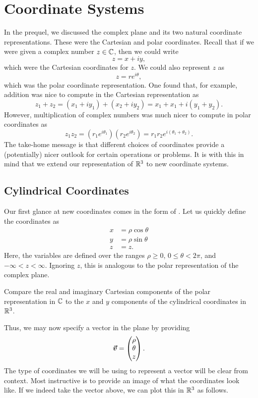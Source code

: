 \chapter{Coordinate Systems}
In the prequel, we discussed the complex plane and its two natural coordinate representations.  These were the Cartesian and polar coordinates.  Recall that if we were given a complex number $z\in \mathbb{C}$, then we could write
\[
z=x+iy,
\]
which were the Cartesian coordinates for $z$. We could also represent $z$ as
\[
z=re^{i\theta},
\]
which was the polar coordinate representation.  One found that, for example, addition was nice to compute in the Cartesian representation as
\[
z_1+z_2 = (x_1+iy_1)+(x_2+iy_2) = x_1+x_1 + i (y_1+y_2).
\]
However, multiplication of complex numbers was much nicer to compute in polar coordinates as
\[
z_1z_2 = \left(r_1 e^{i\theta_1}\right)\left(r_2 e^{i\theta_2}\right) = r_1r_2 e^{i(\theta_1+\theta_2)}.
\]
The take-home message is that different choices of coordinates provide a (potentially) nicer outlook for certain operations or problems. It is with this in mind that we extend our representation of $\mathbb{R}^3$ to new coordinate systems.

\section{Cylindrical Coordinates}

Our first glance at new coordinates comes in the form of .  Let us quickly define the coordinates as
\begin{align*}
	x &= \rho \cos \theta\\
	y &= \rho \sin \theta\\
	z &= z.
\end{align*}
Here, the variables are defined over the ranges $\rho\geq0$, $0\leq \theta < 2\pi$, and $-\infty < z < \infty$.  Ignoring $z$, this is analogous to the polar representation of the complex plane.

\begin{exercise}
	Compare the real and imaginary Cartesian components of the polar representation in $\mathbb{C}$ to the $x$ and $y$ components of the cylindrical coordinates in $\mathbb{R}^3$.
\end{exercise}	

Thus, we may now specify a vector in the plane by providing
\[
\boldsymbol{\boldsymbol{\vec{v}}} = \begin{pmatrix} \rho \\ \theta \\ z \end{pmatrix}.
\]
The type of coordinates we will be using to represent a vector will be clear from context.  Most instructive is to provide an image of what the coordinates look like.  If we indeed take the vector above, we can plot this in $\mathbb{R}^3$ as follows.

